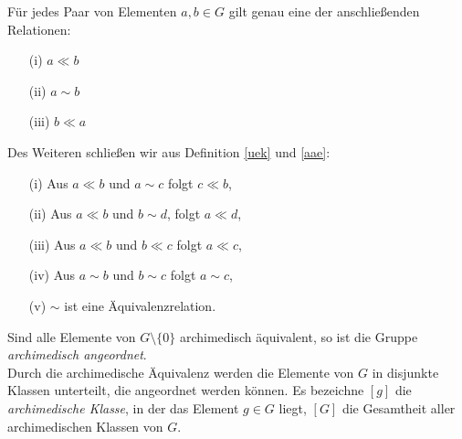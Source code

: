 \begin{folg}
Für jedes Paar von Elementen $a, b \in G$ gilt genau eine der anschließenden Relationen: 
\begin{multicols}{3}
\begin{enumerate}
\item[(i)] $a \ll b$
\item[(ii)] $a \sim b$
\item[(iii)] $b \ll a$ 
\end{enumerate}
\end{multicols}
%
Des Weiteren schließen wir aus Definition \ref{uek} und \ref{aae}:
\begin{enumerate}
\item[(i)] Aus $a \ll b$ und $a \sim c$ folgt $c \ll b$,
\item[(ii)] Aus $a \ll b$ und $b \sim d$, folgt $a \ll d$,
\item[(iii)] Aus $a \ll b$ und $b \ll c$ folgt $a \ll c$,
\item[(iv)] Aus $a \sim b$ und $b \sim c$ folgt $a \sim c$,
\item[(v)] $\sim$ ist eine Äquivalenzrelation.
\end{enumerate}
Sind alle Elemente von $G\setminus\lbrace 0 \rbrace$ archimedisch äquivalent, so ist die Gruppe \textit{archimedisch angeordnet}. \\ 
Durch die archimedische Äquivalenz werden die Elemente von $G$ in disjunkte Klassen unterteilt, die angeordnet werden können. Es bezeichne $[g]$ die \textit{archimedische Klasse}, in der das Element $g \in G$ liegt, $[G]$ die Gesamtheit aller archimedischen Klassen von $G$. \label{archimedischeKlassen}\\
\end{folg}
%
%
%
